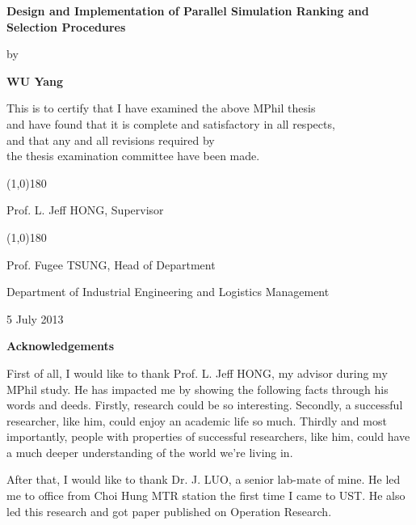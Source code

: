 \documentclass[12pt,a4paper]{report}
\begin{document}
\newpage

\null\vspace{1.0cm}
\begin{center}
{\Large\bf Design and Implementation of Parallel Simulation Ranking and Selection Procedures}
\vspace{1.5cm}

{\large by}\smallskip

{\large\bf WU Yang}\normalsize

\vspace{1cm}

This is to certify that I have examined the above MPhil thesis \\
and have found that it is complete and satisfactory in all respects, \\
and that any and all revisions required by \\
the thesis examination committee have been made.

\vspace{2.0cm}

\line(1,0){180} \smallskip

Prof. L. Jeff HONG, Supervisor
\vspace{1.5cm}

\line(1,0){180} \smallskip

Prof. Fugee TSUNG, Head of Department
\medskip

Department of Industrial Engineering and Logistics Management\medskip

5 July 2013
\end{center}

\newpage

\begin{center}{\Large\bf Acknowledgements}\normalsize
\end{center}
\vspace{0.5cm}

First of all, I would like to thank Prof. L. Jeff HONG, my advisor during my MPhil study. He has impacted me by showing the following facts through his words and deeds. Firstly, research could be so interesting. Secondly, a successful researcher, like him, could enjoy an academic life so much. Thirdly and most importantly, people with properties of successful researchers, like him, could have a much deeper understanding of the world we're living in.

After that, I would like to thank Dr. J. LUO, a senior lab-mate of mine. He led me to office from Choi Hung MTR station the first time I came to UST. He also led this research and got paper published on Operation Research.
\end{document}
